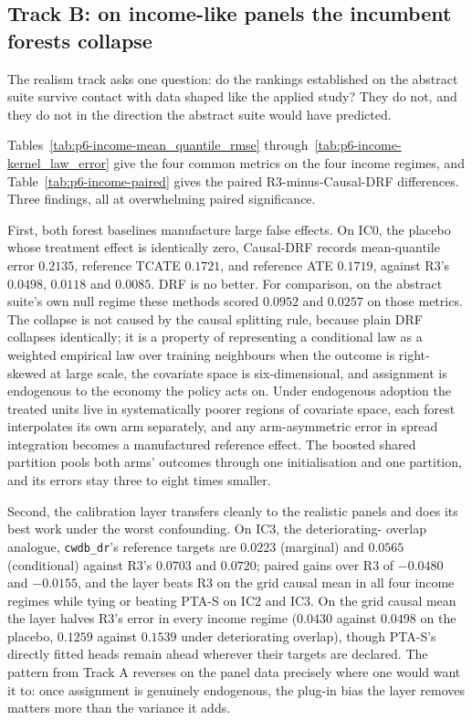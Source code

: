 \subsection{Track B: on income-like panels the incumbent forests collapse}
\label{sub:p6-income}

The realism track asks one question: do the rankings established on the
abstract suite survive contact with data shaped like the applied study? They
do not, and they do not in the direction the abstract suite would have
predicted.

Tables~\ref{tab:p6-income-mean_quantile_rmse}
through~\ref{tab:p6-income-kernel_law_error} give the four common metrics on
the four income regimes, and Table~\ref{tab:p6-income-paired} gives the paired
R3-minus-Causal-DRF differences. Three findings, all at overwhelming paired
significance.

First, both forest baselines manufacture large false effects. On IC0, the
placebo whose treatment effect is identically zero, Causal-DRF records
mean-quantile error $0.2135$, reference TCATE $0.1721$, and reference ATE
$0.1719$, against R3's $0.0498$, $0.0118$ and $0.0085$. DRF is no better. For
comparison, on the abstract suite's own null regime these methods scored
$0.0952$ and $0.0257$ on those metrics. The collapse is not caused by the
causal splitting rule, because plain DRF collapses identically; it is a
property of representing a conditional law as a weighted empirical law over
training neighbours when the outcome is right-skewed at large scale, the
covariate space is six-dimensional, and assignment is endogenous to the
economy the policy acts on. Under endogenous adoption the treated units live
in systematically poorer regions of covariate space, each forest interpolates
its own arm separately, and any arm-asymmetric error in spread integration
becomes a manufactured reference effect. The boosted shared partition pools
both arms' outcomes through one initialisation and one partition, and its
errors stay three to eight times smaller.

Second, the calibration layer transfers cleanly to the realistic panels and
does its best work under the worst confounding. On IC3, the deteriorating-
overlap analogue, \texttt{cwdb\_dr}'s reference targets are $0.0223$
(marginal) and $0.0565$ (conditional) against R3's $0.0703$ and $0.0720$;
paired gains over R3 of $-0.0480$ and $-0.0155$, and the layer beats R3 on the
grid causal mean in all four income regimes while tying or beating PTA-S on
IC2 and IC3. On the grid causal mean the layer halves R3's error in every income regime
($0.0430$ against $0.0498$ on the placebo, $0.1259$ against $0.1539$ under
deteriorating overlap), though PTA-S's directly fitted heads remain ahead
wherever their targets are declared. The pattern from Track A reverses on the
panel data precisely where one would want it to: once assignment is genuinely
endogenous, the plug-in bias the layer removes matters more than the variance
it adds.

